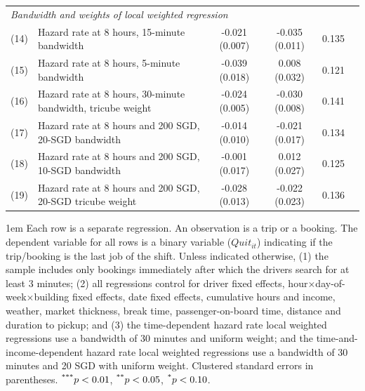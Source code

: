 \documentclass[reviewmode,AEJ]{AEA}
\begin{document}
\begin{table}[]
\begin{tabularx}{\textwidth}{ll@{\extracolsep{\fill}}*{4}{c}}
    	\midrule
    	\multicolumn{5}{l}{\textit{Bandwidth and weights of local weighted regression}} \\
    	(14) & Hazard rate at 8 hours, 15-minute bandwidth & -0.021\sym{**} (0.007) & -0.035\sym{**} (0.011) & 0.135 \\
    	(15) & Hazard rate at 8 hours, 5-minute bandwidth & -0.039\sym{*} (0.018) & 0.008 (0.032) & 0.121 \\
    	(16) & Hazard rate at 8 hours, 30-minute bandwidth, tricube weight & -0.024\sym{***} (0.005) & -0.030\sym{***} (0.008) & 0.141 \\
    	(17) & Hazard rate at 8 hours and 200 SGD, 20-SGD bandwidth & -0.014 (0.010) & -0.021 (0.017) & 0.134 \\
    	(18) & Hazard rate at 8 hours and 200 SGD, 10-SGD bandwidth & -0.001 (0.017) & 0.012 (0.027) & 0.125 \\
    	(19) & Hazard rate at 8 hours and 200 SGD, 20-SGD tricube weight & -0.028\sym{*} (0.013) & -0.022 (0.023) & 0.136 \\
    	\bottomrule
    \end{tabularx}%
    \label{tb:immepickup}
	\begin{tablenotes}
		\parindent 1em%
		\small
	    Each row is a separate regression. An observation is a trip or a booking. The dependent variable for all rows is a binary variable ($Quit_{it}$) indicating if the trip/booking is the last job of the shift. Unless indicated otherwise, (1) the sample includes only bookings immediately after which the drivers search for at least 3 minutes; (2) all regressions control for driver fixed effects, hour\(\times\)day-of-week\(\times\)building fixed effects, date fixed effects,  cumulative hours and income, weather, market thickness, break time, passenger-on-board time, distance and duration to pickup; and (3) the time-dependent hazard rate local weighted regressions use a bandwidth of 30 minutes and uniform weight; and the time-and-income-dependent hazard rate local weighted regressions use a bandwidth of 30 minutes and 20 SGD with uniform weight. Clustered standard errors in parentheses. $\textsuperscript{***}p < 0.01$, $\textsuperscript{**}p < 0.05$, $\textsuperscript{*}p < 0.10$.  
	\end{tablenotes}
    \label{tb:robustcheck}
\end{table}

\end{document}

